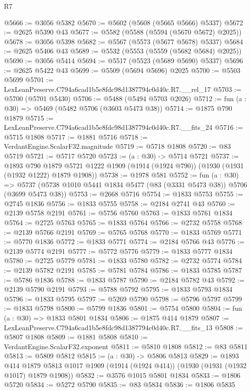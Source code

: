 \begin{lexlean}{R7}
\begin{coremodule}
@5666 := @3056 @5382
@5670 := @5602 (@5608 (@5665 @5666) @5337)
@5672 := @2625 @5390 @43
@5677 := @5582 (@5588 (@5594 (@5670 @5672) @2025))
@5678 := @3056 @5398
@5682 := @5567 (@5573 (@5677 @5678) @5337)
@5684 := @2625 @5406 @43
@5689 := @5532 (@5553 (@5559 (@5682 @5684) @2025))
@5690 := @3056 @5414
@5694 := @5517 (@5523 (@5689 @5690) @5337)
@5696 := @2625 @5422 @43
@5699 := @5509 (@5694 @5696) @2025
@5700 := @5503 @5699
@5701 := LexLeanPreserve.C794a6cad1b5e8fdc98d1387794c0d40c.R7.__rel_17
@5703 := @5700 (@5701 @5430)
@5706 := @5488 (@5494 @5703 @2026)
@5712 := fun (a : @30) => @5469 (@5482 @5706 (@3603 @5473 @38))
@5714 := @1875 @790 @1879
@5715 := LexLeanPreserve.C794a6cad1b5e8fdc98d1387794c0d40c.R7.__fits_24
@5716 := @5715 @1808
@5717 := @1881 @5716
@5718 := VerdantEngine.ScalarF32.magnitude
@5719 := @5718 @1808
@5720 := @83 @5719
@5721 := @5717 @5720
@5723 := (a : @30) -> @5714 @5721
@5737 := @1893
    @790
    @1879
    @5721
    @1222
    @1909
    (@1914 (@1924 @790))
    (@1930 (@1931 (@1932 @1222) @1879 @1908))
@5738 := @1978 @581
@5752 := fun (a : @30) =>
  @5737 (@5738 @1010 @5441 @1834 @5477 (@83 (@3331 @5473 @38)) @5706 (@3699 @5473 @38))
@5753 := @2668 @5716
@5754 := @1833 @5753
@5755 := @2745 @1836
@5756 := @1833 @5755
@5758 := @2184 @2741 @43
@5760 := @2139 @5758 @2191
@5761 := @5756 @5760
@5763 := @1833 @5761 @1834
@5764 := @2725 @5763
@5765 := @1833 @5764
@5766 := @2732 @5758
@5768 := @2139 @5766 @2191
@5769 := @5765 @5768
@5770 := @1833 @5769
@5771 := @5770 @1836
@5772 := @1833 @5771
@5774 := @2184 @5766 @43
@5776 := @2139 @5774 @2191
@5777 := @5772 @5776
@5779 := @1833 @5777 @1834
@5780 := @2725 @5779
@5781 := @1833 @5780
@5782 := @2732 @5774
@5784 := @2139 @5782 @2191
@5785 := @5781 @5784
@5786 := @1833 @5785
@5787 := @5786 @1836
@5788 := @1833 @5787
@5790 := @2184 @5782 @43
@5792 := @2139 @5790 @2191
@5793 := @5788 @5792
@5795 := @1833 @5793 @1834
@5796 := @1833 @5795
@5797 := @5269 @5790
@5798 := @5796 @5797
@5799 := @1833 @5798
@5800 := @5799 @1836
@5801 := @5754 @5800
@5804 := fun (a : @30) => @1833 @5801 @1834
@5806 := @1875 @414 @1879
@5807 := LexLeanPreserve.C794a6cad1b5e8fdc98d1387794c0d40c.R7.__fits_13
@5808 := @5807 @1808
@5809 := @1881 @5808
@5810 := VerdantEngine.ScalarF32.exponent
@5811 := @5810 @1808
@5812 := @83 @5811
@5813 := @5809 @5812
@5815 := (a : @30) -> @5806 @5813
@5829 := @1893
    @414
    @1879
    @5813
    @1017
    @1909
    (@1914 (@1924 @414))
    (@1930 (@1931 (@1932 @1017) @1879 @1908))
@5832 := @3576 @1015 @5801 @1834
@5833 := @1806 @5720
@5834 := @5272 @5790
@5835 := @83 @5834
@5836 := @1806 @5835

\end{coremodule}
\end{lexlean}
